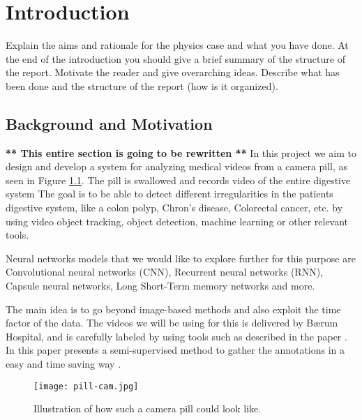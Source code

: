 \documentclass[thesis.tex]{subfiles}
\begin{document}
\chapter{Introduction} \label{chap:introduction}
Explain the aims and rationale for the physics case and what you have done. At the end of the introduction you should give a brief summary of the structure of the report. Motivate the reader and give overarching ideas. Describe what has been done and the structure of the report (how is it organized).

\section{Background and Motivation} \label{sec:background_and_motivation}
\textbf{** This entire section is going to be rewritten **} \bigbreak \noindent
In this project we aim to design and develop a system for analyzing medical videos from a camera pill, as seen in Figure \ref{fig:pill-cam}. The pill is swallowed and records video of the entire digestive system The goal is to be able to detect different irregularities in the patients digestive system, like a colon polyp, Chron's disease, Colorectal cancer, etc. by using video object tracking, object detection, machine learning or other relevant tools.

Neural networks models that we would like to explore further for this purpose are Convolutional neural networks (CNN), Recurrent neural networks (RNN), Capsule neural networks, Long Short-Term memory networks and more.

The main idea is to go beyond image-based methods and also exploit the time factor of the data. 
The videos we will be using for this is delivered by Bærum Hospital, and is carefully labeled by using tools such as described in the paper . In this paper \citeauthor*{ExpertDriven15} presents a semi-supervised method to gather the annotations in a easy and time saving way \cite{ExpertDriven15}.

\begin{figure}[H] %
  \begin{center}
    \texttt{[image: pill-cam.jpg]}
    \caption[Illustration of how such a camera pill could look like]{Illustration of how such a camera pill could look like\footnotemark.}
    \label{fig:pill-cam}
  \end{center}
\end{figure}
\end{document}
